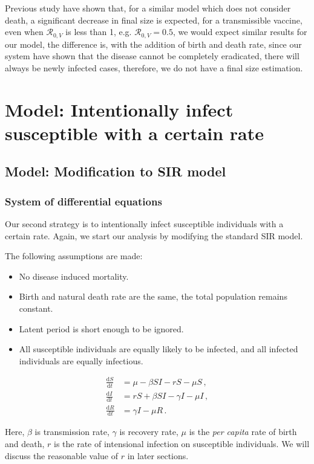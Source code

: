 \documentclass[12pt]{article}
\newcommand\dbyd[2]{\frac{\mathrm d{#1}}{\mathrm d{#2}}}
\newcommand{\R}{\mathcal{R}}
\begin{document}
Previous study have shown that, for a similar model which does not consider death, a significant decrease in final size is expected, for a transmissible vaccine, even when $\R_{0,V}$ is less than 1, e.g. $\R_{0,V}=0.5$, we would expect similar results for our model, the difference is, with the addition of birth and death rate, since our system have shown that the disease cannot be completely eradicated, there will always be newly infected cases, therefore, we do not have a final size estimation. 

\section{Model: Intentionally infect susceptible with a certain rate}
\subsection{Model: Modification to SIR model}
\subsubsection{System of differential equations}
Our second strategy is to intentionally infect susceptible individuals with a certain rate. Again, we start our analysis by modifying the standard SIR model.

The following assumptions are made:
\begin{itemize}
\item No disease induced mortality.
\item Birth and natural death rate are the same, the total population remains constant.
\item Latent period is short enough to be ignored.
\item All susceptible individuals are equally likely to be infected, and all infected individuals are equally infectious.
\end{itemize}

\begin{equation}\label{1}
\begin{split}
\dbyd{S}{t}&=\mu- \beta SI-rS-\mu S\,, \\
\dbyd{I}{t}&=rS+\beta SI-\gamma I -\mu I\,,\\
\dbyd{R}{t}&=\gamma I-\mu R\,.
\end{split}
\end{equation}

Here, $\beta$ is transmission rate, $\gamma$ is recovery rate, $\mu$ is the \emph{per capita} rate of birth and death, $r$ is the rate of intensional infection on susceptible individuals. We will discuss the reasonable value of $r$ in later sections.
\end{document}

